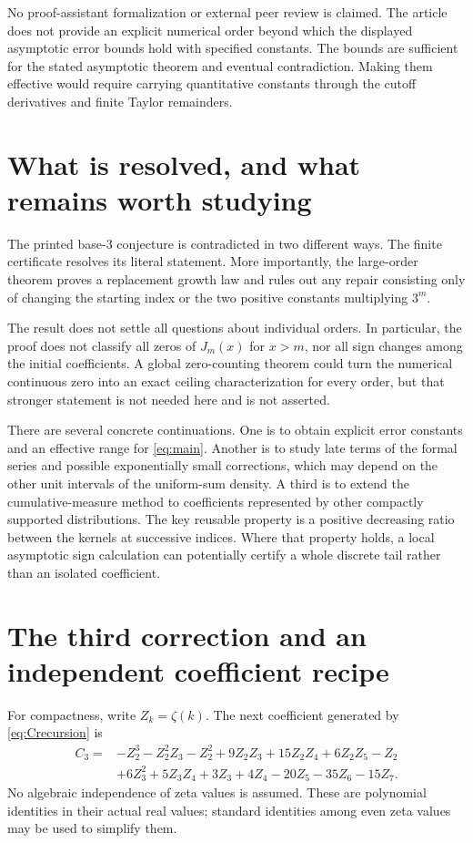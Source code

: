 \documentclass[11pt]{article}
\numberwithin{equation}{section}
\theoremstyle{definition}
\begin{document}
No proof-assistant formalization or external peer review is claimed.
The article does not provide an explicit numerical order beyond which
the displayed asymptotic error bounds hold with specified constants.
The bounds are sufficient for the stated asymptotic theorem and eventual
contradiction. Making them effective would require carrying quantitative
constants through the cutoff derivatives and finite Taylor remainders.

\section{What is resolved, and what remains worth studying}\label{sec:outlook}

The printed base-$3$ conjecture is contradicted in two different ways.
The finite certificate resolves its literal statement. More importantly,
the large-order theorem proves a replacement growth law and rules out
any repair consisting only of changing the starting index or the two
positive constants multiplying $3^m$.

The result does not settle all questions about individual orders.
In particular, the proof does not classify all zeros of $J_m(x)$ for
$x>m$, nor all sign changes among the initial coefficients. A global
zero-counting theorem could turn the numerical continuous zero into an
exact ceiling characterization for every order, but that stronger
statement is not needed here and is not asserted.

There are several concrete continuations. One is to obtain explicit
error constants and an effective range for \eqref{eq:main}. Another is
to study late terms of the formal series and possible exponentially
small corrections, which may depend on the other unit intervals of the
uniform-sum density. A third is to extend the cumulative-measure method
to coefficients represented by other compactly supported distributions.
The key reusable property is a positive decreasing ratio between the
kernels at successive indices. Where that property holds, a local
asymptotic sign calculation can potentially certify a whole discrete
tail rather than an isolated coefficient.

\appendix
\section{The third correction and an independent coefficient recipe}\label{sec:appendixcoeffs}
For compactness, write $Z_k=\zeta(k)$. The next coefficient generated by
\eqref{eq:Crecursion} is
\begin{equation}\label{eq:C3}
\begin{split}
 C_3={}&-Z_2^3-Z_2^2Z_3-Z_2^2+9Z_2Z_3+15Z_2Z_4+6Z_2Z_5-Z_2\\
       &+6Z_3^2+5Z_3Z_4+3Z_3+4Z_4-20Z_5-35Z_6-15Z_7.
\end{split}
\end{equation}
No algebraic independence of zeta values is assumed. These are polynomial
identities in their actual real values; standard identities among even
zeta values may be used to simplify them.
\end{document}
